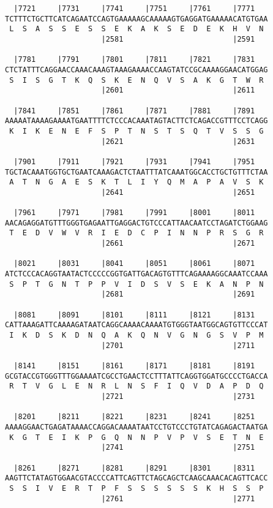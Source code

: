 \documentclass{article}
\begin{document}
\begin{Verbatim}
  |7721     |7731     |7741     |7751     |7761     |7771   
TCTTTCTGCTTCATCAGAATCCAGTGAAAAAGCAAAAAGTGAGGATGAAAAACATGTGAA
 L  S  A  S  S  E  S  S  E  K  A  K  S  E  D  E  K  H  V  N 
                      |2581                         |2591   
  
  |7781     |7791     |7801     |7811     |7821     |7831   
CTCTATTTCAGGAACCAAACAAAGTAAAGAAAACCAAGTATCCGCAAAAGGAACATGGAG
 S  I  S  G  T  K  Q  S  K  E  N  Q  V  S  A  K  G  T  W  R 
                      |2601                         |2611   
  
  |7841     |7851     |7861     |7871     |7881     |7891   
AAAAATAAAAGAAAATGAATTTTCTCCCACAAATAGTACTTCTCAGACCGTTTCCTCAGG
 K  I  K  E  N  E  F  S  P  T  N  S  T  S  Q  T  V  S  S  G 
                      |2621                         |2631   
  
  |7901     |7911     |7921     |7931     |7941     |7951   
TGCTACAAATGGTGCTGAATCAAAGACTCTAATTTATCAAATGGCACCTGCTGTTTCTAA
 A  T  N  G  A  E  S  K  T  L  I  Y  Q  M  A  P  A  V  S  K 
                      |2641                         |2651   
  
  |7961     |7971     |7981     |7991     |8001     |8011   
AACAGAGGATGTTTGGGTGAGAATTGAGGACTGTCCCATTAACAATCCTAGATCTGGAAG
 T  E  D  V  W  V  R  I  E  D  C  P  I  N  N  P  R  S  G  R 
                      |2661                         |2671   
  
  |8021     |8031     |8041     |8051     |8061     |8071   
ATCTCCCACAGGTAATACTCCCCCGGTGATTGACAGTGTTTCAGAAAAGGCAAATCCAAA
 S  P  T  G  N  T  P  P  V  I  D  S  V  S  E  K  A  N  P  N 
                      |2681                         |2691   
  
  |8081     |8091     |8101     |8111     |8121     |8131   
CATTAAAGATTCAAAAGATAATCAGGCAAAACAAAATGTGGGTAATGGCAGTGTTCCCAT
 I  K  D  S  K  D  N  Q  A  K  Q  N  V  G  N  G  S  V  P  M 
                      |2701                         |2711   
  
  |8141     |8151     |8161     |8171     |8181     |8191   
GCGTACCGTGGGTTTGGAAAATCGCCTGAACTCCTTTATTCAGGTGGATGCCCCTGACCA
 R  T  V  G  L  E  N  R  L  N  S  F  I  Q  V  D  A  P  D  Q 
                      |2721                         |2731   
  
  |8201     |8211     |8221     |8231     |8241     |8251   
AAAAGGAACTGAGATAAAACCAGGACAAAATAATCCTGTCCCTGTATCAGAGACTAATGA
 K  G  T  E  I  K  P  G  Q  N  N  P  V  P  V  S  E  T  N  E 
                      |2741                         |2751   
  
  |8261     |8271     |8281     |8291     |8301     |8311   
AAGTTCTATAGTGGAACGTACCCCATTCAGTTCTAGCAGCTCAAGCAAACACAGTTCACC
 S  S  I  V  E  R  T  P  F  S  S  S  S  S  S  K  H  S  S  P 
                      |2761                         |2771   
  

\end{Verbatim}
\end{document}

